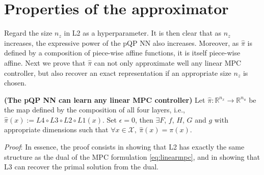 \section{Properties of the approximator}
\label{sec.properties_approx}
Regard the size $n_z$ in L2 as a hyperparameter. It is then clear that as $n_z$ increases, the expressive power of the pQP NN also increases. Moreover, as $\hat\pi$ is defined by a composition of piece-wise affine functions, it is itself piece-wise affine. Next we prove that $\hat\pi$ can not only approximate well any linear MPC controller, but also recover an exact representation if an appropriate size $n_z$ is chosen.

\begin{theorem}
	\label{thm:pQPrepr}
	\textbf{(The pQP NN can learn any linear MPC controller)} Let $\hat{\pi}: \mathbb{R}^{n_x} \rightarrow \mathbb{R}^{n_u}$ be the map defined by the composition of all four layers, i.e., $\hat{\pi}(x) := L4 \circ L3 \circ L2 \circ L1(x)$. Set $\epsilon = 0$, then $\exists F$, $f$, $H$, $G$ and $g$ with appropriate dimensions such that $\forall x \in \mathcal{X}, \ \hat{\pi}(x) = \pi(x)$.
\end{theorem}

\textit{Proof}: In essence, the proof consists in showing that L2 has exactly the same structure as the dual of the MPC formulation \eqref{eq:linearmpc}, and in showing that L3 can recover the primal solution from the dual.

